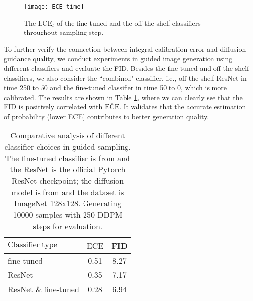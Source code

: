 \documentclass{article}
\theoremstyle{definition}
\begin{document}
\begin{figure}[h]
  \centering
\texttt{[image: ECE\_time]}
  \caption{The $\text{ECE}_t$ of the fine-tuned and the off-the-shelf classifiers throughout sampling step.}
  \label{fig:ECE_time}
\end{figure}


To further verify the connection between integral calibration error and diffusion guidance quality, we conduct experiments in guided image generation using different classifiers and evaluate the FID. 
Besides the fine-tuned and off-the-shelf classifiers, we also consider the ``combined" classifier, i.e., off-the-shelf ResNet in time 250 to 50 and the fine-tuned classifier in time 50 to 0, which is more calibrated. 
The results are shown in Table \ref{table:compare_calibration_model}, where we can clearly see that the FID is positively correlated with $\overline{\text{ECE}}$. 
It validates that the accurate estimation of probability (lower ECE) contributes to better generation quality. 





\begin{table}[h!]
\caption{Comparative analysis of different classifier choices in guided sampling. The fine-tuned classifier is from \cite{dhariwal2021diffusion} and the ResNet is the official Pytorch ResNet checkpoint; the diffusion model is from \cite{dhariwal2021diffusion} and the dataset is ImageNet 128x128. Generating 10000 samples with 250 DDPM steps for evaluation.}
\label{table:compare_calibration_model}
\begin{center}
\begin{small}
\begin{sc}

\begin{tabular}{lcc}
\toprule
$\text{Classifier type}$   & $\overline{\text{ECE}}$ & FID \\
\midrule
fine-tuned                 &  0.51 &  8.27 \\
ResNet                     &  0.35 &  7.17\\
ResNet \& fine-tuned         &  0.28 &  6.94\\

\bottomrule
\end{tabular}
\end{sc}
\end{small}
\end{center}
\end{table}
\end{document}
